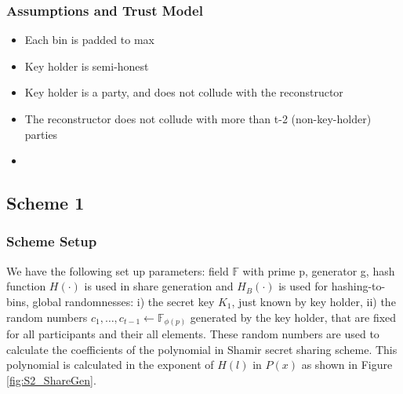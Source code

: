 \subsubsection{Assumptions and Trust Model}
\begin{itemize}
    \item Each bin is padded to max
    \item Key holder is semi-honest
    \item Key holder is a party, and does not collude with the reconstructor
    \item The reconstructor does not collude with more than t-2 (non-key-holder)
    parties
    \item
\end{itemize}

\subsection{Scheme 1}
\subsubsection{Scheme Setup}
We have the following set up parameters: field $\mathbb{F}$ with prime p, generator g, hash function $H(\cdot)$ is used in share generation and $H_B(\cdot)$ is used for hashing-to-bins, global randomnesses: i) the secret key $K_1$, just known by key holder, ii) the random numbers $c_1, \ldots, c_{t-1} \gets \mathbb{F}_{\phi(p)}$ generated by the key holder, that are fixed for all participants and their all elements. These random numbers are used to calculate the coefficients of the polynomial in Shamir secret sharing scheme. This polynomial is calculated in the exponent of $H(l)$ in $P(x)$ as shown in Figure \ref{fig:S2_ShareGen}.

